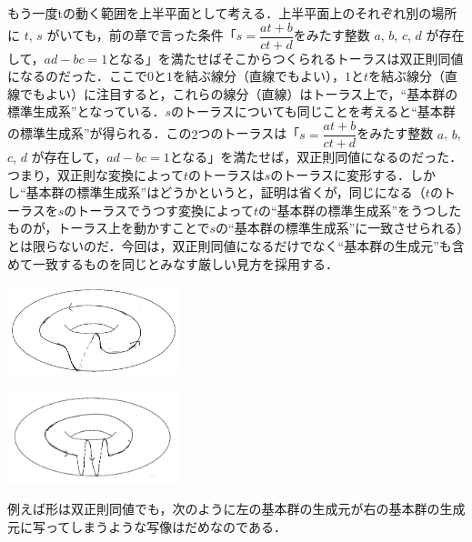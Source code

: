 もう一度tの動く範囲を上半平面として考える．上半平面上のそれぞれ別の場所に $t$, $s$ がいても，前の章で言った条件「$s=\dfrac {at+b} {ct+d}$をみたす整数 $a$, $b$, $c$, $d$ が存在して，$ad-bc=1$となる」を満たせばそこからつくられるトーラスは双正則同値になるのだった．ここで$0$と$1$を結ぶ線分（直線でもよい），$1$と$t$を結ぶ線分（直線でもよい）に注目すると，これらの線分（直線）はトーラス上で，``基本群の標準生成系''となっている．$s$のトーラスについても同じことを考えると``基本群の標準生成系''が得られる．この$2$つのトーラスは「$s=\dfrac {at+b} {ct+d}$をみたす整数 $a$, $b$, $c$, $d$ が存在して，$ad-bc=1$となる」を満たせば，双正則同値になるのだった．つまり，双正則な変換によって$t$のトーラスは$s$のトーラスに変形する．しかし``基本群の標準生成系''はどうかというと，証明は省くが，同じになる（$t$のトーラスを$s$のトーラスでうつす変換によって$t$の``基本群の標準生成系''をうつしたものが，トーラス上を動かすことで$s$の``基本群の標準生成系''に一致させられる）とは限らないのだ．今回は，双正則同値になるだけでなく``基本群の生成元''も含めて一致するものを同じとみなす厳しい見方を採用する．\\
\begin{minipage}{0.5\hsize}
\includegraphics[width=5cm]{asaka12.png}\\
\end{minipage}
\begin{minipage}{0.5\hsize}
\includegraphics[width=5cm]{asaka14.png}\\
\end{minipage}

例えば形は双正則同値でも，次のように左の基本群の生成元が右の基本群の生成元に写ってしまうような写像はだめなのである．

